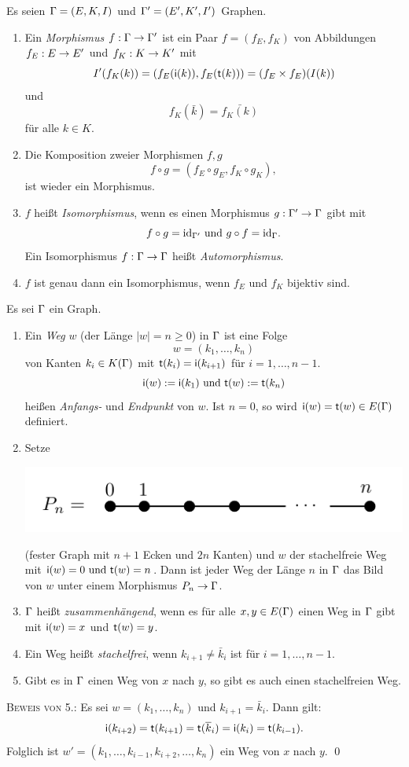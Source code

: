 \documentclass[a4paper, 12pt, twoside]{article}
\begin{document}
\DB Es seien $\Gamma=(E,K,I)$ und $\Gamma'=(E',K',I')$ Graphen.
\begin{enumerate}
\item Ein \emph{Morphismus} $f:\Gamma\rightarrow\Gamma'$ ist ein
Paar $f=(f_E,f_K)$ von Abbildungen
$f_E:E\rightarrow E'$ und $f_K:K\rightarrow K'$ mit
\[
I'(f_K(k)) = ( f_E(\mathsf{i}(k)), f_E(\mathsf{t}(k)) )
= (f_E \times f_E)(I(k))
\]
und
\[
f_K(\bar{k}) = \bar{f_K(k)}
\]
für alle $k\in K$.
\item Die Komposition zweier Morphismen $f,g$
\[
f\circ g = (f_E\circ g_E, f_K\circ g_K),
\]
ist wieder ein Morphismus.
\item $f$ heißt \emph{Isomorphismus}, wenn es
einen Morphismus $g:\Gamma'\rightarrow\Gamma$ gibt mit
\[
f\circ g = \mathrm{id}_{\Gamma'} \text{ und } g\circ f=\mathrm{id}_{\Gamma}.
\]
Ein Isomorphismus $f:\Gamma\rightarrow\Gamma$ heißt \emph{Automorphismus}.
\item $f$ ist genau dann ein Isomorphismus, wenn $f_E$ und $f_K$
bijektiv sind.
\end{enumerate}

\DB Es sei $\Gamma$ ein Graph.
\begin{enumerate}
\item Ein \emph{Weg} $w$ (der Länge $|w|=n\geq 0$) in $\Gamma$
ist eine Folge
\[
w = (k_1,\ldots,k_n)
\]
von Kanten $k_i\in K(\Gamma)$ mit $\mathsf{t}(k_i)=\mathsf{i}(k_{i+1})$ für
$i=1,\ldots,n-1$.
\[
\mathsf{i}(w):=\mathsf{i}(k_1) \text{ und } \mathsf{t}(w):=\mathsf{t}(k_n)
\]
heißen \emph{Anfangs-} und \emph{Endpunkt} von $w$.
Ist $n=0$, so wird $\mathsf{i}(w)=\mathsf{t}(w)\in E(\Gamma)$ definiert.
\item Setze
\begin{center}
	\includegraphics{grugraImages/Pn}
\end{center}
(fester Graph mit $n+1$ Ecken und $2n$ Kanten) und $w$ der stachelfreie Weg mit
$\mathsf{i}(w)=0 \text{ und } \mathsf{t}(w)=n$. Dann ist jeder Weg der Länge $n$ in $\Gamma$ das Bild
von $w$ unter einem Morphismus $P_n\rightarrow \Gamma$.
\item $\Gamma$ heißt \emph{zusammenhängend},
wenn es für alle $x,y\in E(\Gamma)$ einen Weg in $\Gamma$ gibt mit
$\mathsf{i}(w)=x$ und $\mathsf{t}(w)=y$.
\item Ein Weg heißt \emph{stachelfrei},
wenn $k_{i+1}\neq \bar{k}_i$ ist für $i=1,\ldots,n-1$.
\item Gibt es in $\Gamma$ einen Weg von $x$ nach $y$, so gibt es auch
einen stachelfreien Weg.
\end{enumerate}
\textsc{Beweis von 5.:} Es sei $w=(k_1,\ldots,k_n)$ und
$k_{i+1}=\bar{k}_i$. Dann gilt:
\[
\mathsf{i}(k_{i+2}) = \mathsf{t}(k_{i+1}) = \mathsf{t}(\overline{k}_{i})
= \mathsf{i}(k_i) = \mathsf{t}(k_{i-1}).
\]
Folglich ist $w'=(k_1,\ldots,k_{i-1},k_{i+2},\ldots,k_n)$ ein
Weg von $x$ nach $y$.
\qed
\end{document}
